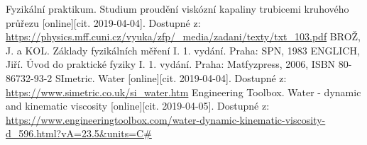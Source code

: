 \documentclass[a4paper]{article}
\begin{document}
\renewcommand\refname{Použitá literatura}
\begin{thebibliography}{}
Fyzikální praktikum. Studium proudění viskózní kapaliny trubicemi kruhového
průřezu [online][cit. 2019-04-04]. Dostupné z:
\url{https://physics.mff.cuni.cz/vyuka/zfp/_media/zadani/texty/txt_103.pdf}
BROŽ, J. a KOL. Základy fyzikálních měření I. 1. vydání. Praha: SPN, 1983
ENGLICH, Jiří. Úvod do praktické fyziky I. 1. vydání. Praha: Matfyzpress, 2006, ISBN 80-86732-93-2
SImetric. Water [online][cit. 2019-04-04]. Dostupné z:
\url{https://www.simetric.co.uk/si_water.htm}
Engineering Toolbox. Water - dynamic and kinematic viscosity [online][cit. 2019-04-05]. Dostupné z:
\url{https://www.engineeringtoolbox.com/water-dynamic-kinematic-viscosity-d_596.html?vA=23.5&units=C#}
\end{thebibliography}
\end{document}
